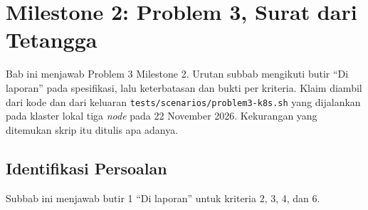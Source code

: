 \chapter[MILESTONE 2: PROBLEM 3]{Milestone 2: Problem 3, Surat dari Tetangga}

Bab ini menjawab Problem 3 Milestone 2. Urutan subbab mengikuti butir ``Di laporan'' pada spesifikasi, lalu keterbatasan dan bukti per kriteria. Klaim diambil dari kode dan dari keluaran \texttt{tests/scenarios/problem3-k8s.sh} yang dijalankan pada klaster lokal tiga \textit{node} pada 22 November 2026. Kekurangan yang ditemukan skrip itu ditulis apa adanya.

\section{Identifikasi Persoalan}

Subbab ini menjawab butir 1 ``Di laporan'' untuk kriteria 2, 3, 4, dan 6.

